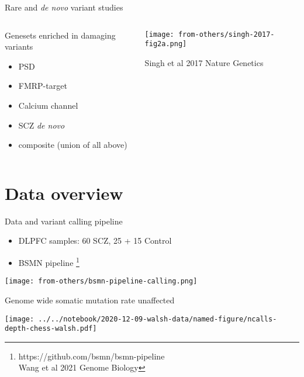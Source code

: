 \documentclass[usenames,dvipsnames]{beamer}
\begin{document}
\begin{frame}[label=rare]{Rare and \textit{de novo} variant studies}
\begin{columns}[t]
\begin{column}{0.5\textwidth}
Genesets enriched in \alert{damaging} variants
\begin{itemize}
\item PSD
\item FMRP-target
\item Calcium channel
\item SCZ \textit{de novo}
\item composite (union of all above)
\end{itemize}
\end{column}

\begin{column}{0.5\textwidth}

\texttt{[image: from-others/singh-2017-fig2a.png]}

\tiny Singh et al 2017 Nature Genetics
\end{column}
\end{columns}
\end{frame}


\section{Data overview}

\begin{frame}{Data and variant calling pipeline}
\begin{itemize}
\item DLPFC samples: 60 SCZ, 25 + 15 Control
\item BSMN pipeline
\footnote{https://github.com/bsmn/bsmn-pipeline \\
	Wang et al 2021 Genome Biology}
\end{itemize}
\texttt{[image: from-others/bsmn-pipeline-calling.png]}

\end{frame}

\begin{frame}{Genome wide somatic mutation rate unaffected}
\begin{center}
\texttt{[image: ../../notebook/2020-12-09-walsh-data/named-figure/ncalls-depth-chess-walsh.pdf]}
\end{center}
\end{frame}
\end{document}
